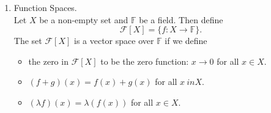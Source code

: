 \documentclass{article}
\begin{document}
\begin{enumerate}
  \item Function Spaces.\\Let $X$ be a non-empty set and $\mathbb{F}$ be a field. Then define \[\mathcal{F}[X] = \{f: X \rightarrow \mathbb{F} \}.\]The set $\mathcal{F}[X]$ is a vector space over $\mathbb{F}$ if we define \begin{itemize}\item the zero in $\mathcal{F}[X]$ to be the zero function: $x \rightarrow 0$ for all $x \in X$.
  \item $(f+g)(x) = f(x) + g(x)$ for all $x \ in X$.
  \item $(\lambda f)(x) = \lambda (f(x))$ for all $x \in X$.
  \end{itemize}
\end{enumerate}
\end{document}
